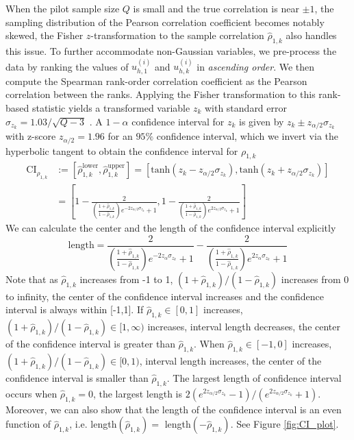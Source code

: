 When the pilot sample size $Q$ is small and the true correlation is near $\pm 1$, the sampling distribution of the Pearson correlation coefficient becomes notably skewed, the Fisher $z$-transformation to the sample correlation $\widehat \rho_{1,k}$ also handles this issue. To further accommodate non-Gaussian variables, we pre-process the data by ranking the values of $u_{h,1}^{(i)}$ and ${u}_{h,k}^{(i)}$ in {\it ascending order}. We then compute the Spearman rank-order correlation coefficient as the Pearson correlation between the ranks. Applying the Fisher transformation to this rank-based statistic yields a transformed variable $z_k$ with standard error $\sigma_{z_k} = 1.03/\sqrt{Q - 3}$ \cite{BiHi:2017, FiHaPe:1957}. A $1-\alpha$ confidence interval for $z_{k}$ is given by $z_k \pm z_{\alpha/2}\sigma_{z_k}$ with z-score $z_{\alpha/2} = 1.96$ for an $95\%$ confidence interval, which we invert via the hyperbolic tangent to obtain the confidence interval for $\rho_{1,k}$
%
\begin{align}
    \nonumber
    \text{CI}_{\rho_{1,k}} &:= \left[\widehat\rho_{1,k}^{\text{lower}},\widehat\rho_{1,k}^{\text{upper}}\right] = \left[\text{tanh}\left(z_k - z_{\alpha/2}\sigma_{z_k}\right),\text{tanh}\left(z_k + z_{\alpha/2}\sigma_{z_k}\right)\right] \\
    \label{eq:Confidence_Interval_rho}
    &=\left[1-\frac{2}{\left(\frac{1+\widehat\rho_{1,k}}{1-\widehat\rho_{1,k}}\right)e^{-2z_{\alpha/2}\sigma_{z_k}}+1}, 1-\frac{2}{\left(\frac{1+\widehat\rho_{1,k}}{1-\widehat\rho_{1,k}}\right)e^{2z_{\alpha/2}\sigma_{z_k}}+1}\right]
\end{align}
%
We can calculate the center and the length of the confidence interval explicitly
\[
\text{length} = \frac{2}{\left(\frac{1+\widehat\rho_{1,k}}{1-\widehat\rho_{1,k}}\right)e^{-2z_\alpha\sigma_{z_k}}+1}-\frac{2}{\left(\frac{1+\widehat\rho_{1,k}}{1-\widehat\rho_{1,k}}\right)e^{2z_\alpha\sigma_{z_k}}+1}
\]
Note that as $\widehat\rho_{1,k}$ increases from -1 to 1, $(1+\widehat\rho_{1,k})/(1-\widehat\rho_{1,k})$ increases from 0 to infinity, the center of the confidence interval increases and the confidence interval is always within [-1,1]. If $\widehat\rho_{1,k}\in[0,1]$ increases, $(1+\widehat\rho_{1,k})/(1-\widehat\rho_{1,k})\in [1,\infty)$ increases, interval length decreases, the center of the confidence interval is greater than $\widehat \rho_{1,k}$. When $\widehat\rho_{1,k}\in[-1,0]$ increases, $(1+\widehat\rho_{1,k})/(1-\widehat\rho_{1,k})\in [0,1)$, interval length increases, the center of the confidence interval is smaller than $\widehat \rho_{1,k}$. The largest length of confidence interval occurs when $\widehat \rho_{1,k}=0$, the largest length is $2(e^{2z_{\alpha/2}\sigma_{z_k}}-1)/(e^{2z_{\alpha/2}\sigma_{z_k}}+1)$. Moreover, we can also show that the length of the confidence interval is an even function of $\widehat \rho_{1,k}$, i.e. length$(\widehat \rho_{1,k})=$ length$(-\widehat \rho_{1,k})$. See Figure \ref{fig:CI_plot}.

